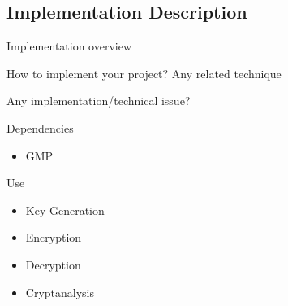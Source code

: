 \subsection{Implementation Description}


Implementation overview

How to implement your project?
  Any related technique

Any implementation/technical issue?

Dependencies
\begin{itemize}
  \item GMP
\end{itemize}

Use
\begin{itemize}
  \item Key Generation
  \item Encryption
  \item Decryption
  \item Cryptanalysis
\end{itemize}
